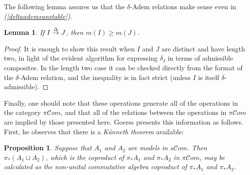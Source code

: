 \documentclass[11pt]{amsart} \renewcommand{\baselinestretch}{1.4}
\theoremstyle{plain}
\newtheorem{lem}[thm]{Lemma}
\newtheorem{prop}[thm]{Proposition}
\theoremstyle{definition}
\renewcommand{\to}{\longrightarrow}
\newcommand{\scrC}{\mathscr{C}}
\newcommand{\citeBOX}[2][]{\cite[\mbox{#1}]{#2}}
\newcommand{\deltaalg}{\Delta} %
\newcommand{\PA}[1]{\pi#1}
\newcommand{\minDimDelta}{m}
\newcommand{\produces}[3]{#3:#1\sim #2}
\renewcommand{\produces}[3]{#1\rightarrow_{#3} #2}%
\renewcommand{\produces}[3]{#1\overset{\smash{#3}}{\rightarrow} #2}%
\newcommand{\algs}{{\scrC\!\textit{om}}}
\begin{document}
\begin{Constructing homotopy operations}
The following lemma assures us that the $\delta$-Adem relations make sense even in \emph{(\ref{deltaademsunstable})}.
\begin{lem}
\label{lemOnAdemChangeInMDeltaPlain}
If $\produces{I}{J}{\deltaalg}$, then $\minDimDelta(I)\geq\minDimDelta(J)$.
\end{lem}
\begin{proof}
It is enough to show this result when $I$ and $J$ are distinct and have length two, in light of the evident algorithm for expressing $\delta_I$ in terms of admissible composites. In the length two case it can be checked directly from the format of the $\delta$-Adem relation, and the inequality is in fact strict (unless $I$ is itself $\delta$-admissible).
\end{proof}
Finally, one should note that these operations generate all of the operations in the category $\PA{\algs}$, and that all of the relations between the operations in $\PA{\algs}$ are implied by those presented here. Goerss \citeBOX[\S2]{MR1089001} presents this information as follows. First, he observes that there is a \emph{K\"unneth theorem} available:
\begin{prop}
\label{salgs homotopy kunneth}
Suppose that $A_1$ and $A_2$ are models in $s\algs$. Then $\pi_*(A_1\sqcup A_2)$, which is the coproduct of $\pi_*A_1$ and $\pi_*A_2$ in $\PA{\algs}$, may be calculated as the non-unital commutative algebra coproduct of $\pi_*A_1$ and $\pi_*A_2$.
\end{prop}

\end{Constructing homotopy operations}
\end{document}
